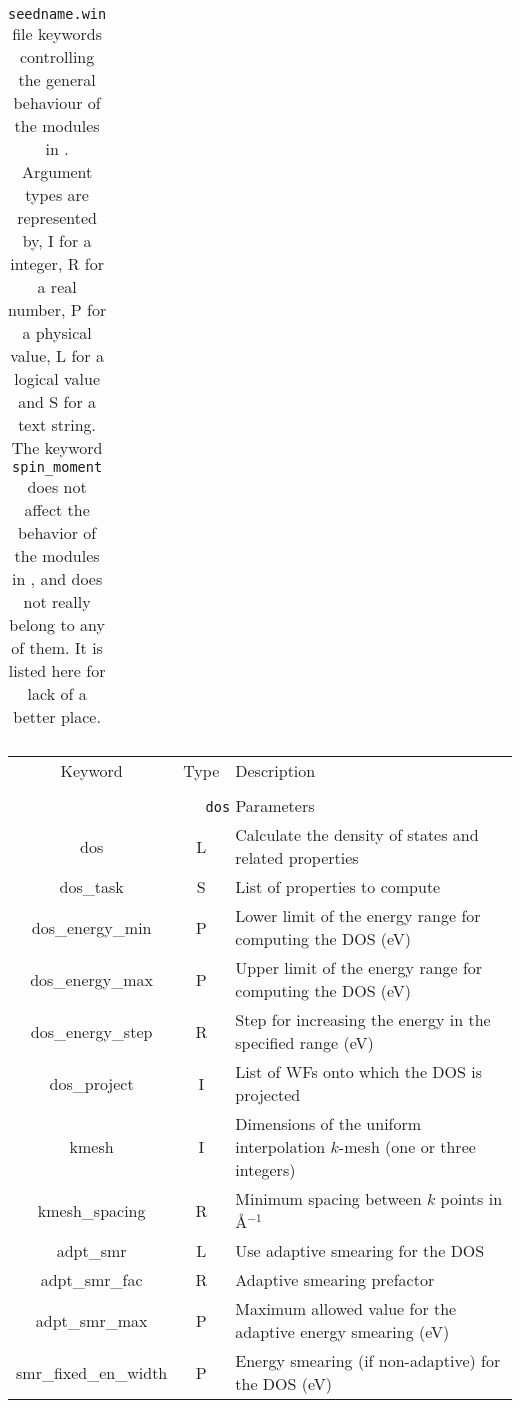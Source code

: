 \begin{table}[h!]
\begin{center}
\begin{tabular}{|c|c|p{6cm}|}
 \hline
\end{tabular}
\caption[Parameter file keywords controlling \postw.]  {{\tt
    seedname.win} file keywords controlling the general behaviour of
  the modules in \postw. Argument types are represented by, I for a
  integer, R for a real number, P for a
  physical value, L for a logical value and S for a text string.\\
  The keyword {\tt spin\_moment} does not affect
    the behavior of the modules in \postw, and does not really belong
    to any of them. It is listed here for lack of a better place.}
\label{parameter_keywords_postw90}
\end{center}
\end{table}


\begin{table}[h!]
\begin{center}
\begin{tabular}{|c|c|p{6cm}|}
  \hline
  Keyword & Type & Description \\
  &      &             \\
  \hline\hline
  \multicolumn{3}{|c|}{{\tt dos} Parameters} \\
  \hline
  {\sc dos}  & L & Calculate the density of states and related properties\\
  {\sc dos\_task}& S  & List of properties to compute \\
  {\sc dos\_energy\_min} & P & Lower limit of the energy range for
  computing the DOS (eV)\\
  {\sc dos\_energy\_max}& P & Upper limit of the energy range for
  computing the DOS (eV)\\
  {\sc dos\_energy\_step}& R & Step for increasing the energy in the specified range (eV)\\
  {\sc dos\_project}& I & List of WFs onto which the DOS is projected\\
  {\sc [dos\_]kmesh} & I & Dimensions of the uniform interpolation $k$-mesh (one or three integers)\\ 
  {\sc [dos\_]kmesh\_spacing}& R & Minimum spacing between $k$ points in \AA$^{-1}$\\
  {\sc [dos\_]adpt\_smr} & L & Use adaptive smearing for the DOS \\
  {\sc [dos\_]adpt\_smr\_fac} & R & Adaptive smearing prefactor\\
  {\sc [dos\_]adpt\_smr\_max} & P & Maximum allowed value for the adaptive energy smearing (eV) \\
  {\sc [dos\_]smr\_fixed\_en\_width} & P  & Energy smearing (if non-adaptive) for the DOS (eV) \\   

\end{tabular}
\end{center}
\end{table}
